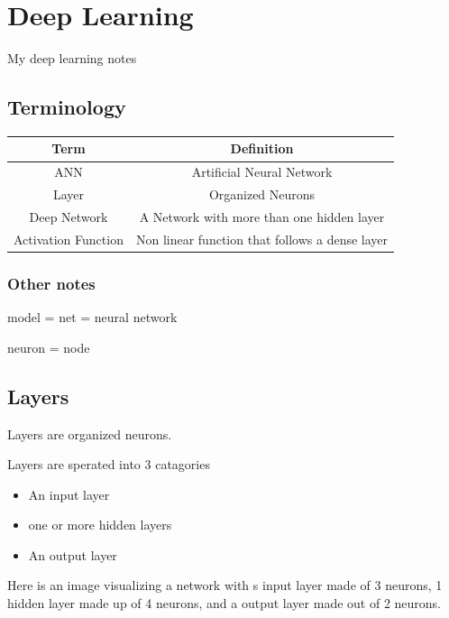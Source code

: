 \documentclass[
]{article}
\author{}
\date{}
\providecommand{\tightlist}{%
  \setlength{\itemsep}{0pt}\setlength{\parskip}{0pt}}
\begin{document}
\hypertarget{deep-learning}{%
\section{Deep Learning}\label{deep-learning}}

My deep learning notes

\hypertarget{terminology}{%
\subsection{Terminology}\label{terminology}}

\begin{longtable}[]{@{}cc@{}}
\toprule
Term & Definition\tabularnewline
\midrule
\endhead
ANN & Artificial Neural Network\tabularnewline
Layer & Organized Neurons\tabularnewline
Deep Network & A Network with more than one hidden layer\tabularnewline
Activation Function & Non linear function that follows a dense
layer\tabularnewline
\bottomrule
\end{longtable}

\hypertarget{other-notes}{%
\subsubsection{Other notes}\label{other-notes}}

model = net = neural network

neuron = node

\hypertarget{layers}{%
\subsection{Layers}\label{layers}}

Layers are organized neurons.

Layers are sperated into 3 catagories

\begin{itemize}
\tightlist
\item
  An input layer
\item
  one or more hidden layers
\item
  An output layer
\end{itemize}

Here is an image visualizing a network with s input layer made of 3
neurons, 1 hidden layer made up of 4 neurons, and a output layer made
out of 2 neurons.
\end{document}
